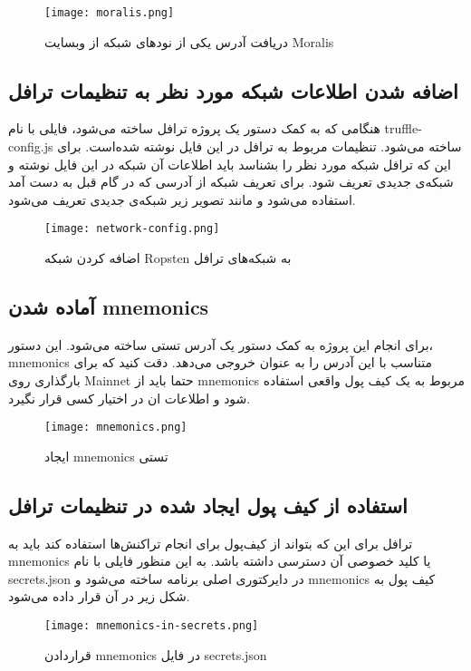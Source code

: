\begin{figure}[ht]
\centerline{\texttt{[image: moralis.png]}}
\caption{دریافت آدرس یکی از نود‌های شبکه از وبسایت Moralis}
\label{fig:moralis}
\end{figure}

\subsection{اضافه شدن اطلاعات شبکه مورد نظر به تنظیمات ترافل}
هنگامی که به کمک دستور
یک پروژه ترافل ساخته می‌شود، فایلی با نام truffle-config.js ساخته می‌شود. تنظیمات مربوط به ترافل در این فایل نوشته شده‌است. برای این که ترافل شبکه مورد نظر را بشناسد باید اطلاعات آن شبکه در این فایل نوشته و شبکه‌ی جدیدی تعریف شود. برای تعریف شبکه از آدرسی که در گام قبل به دست آمد استفاده می‌شود و مانند تصویر زیر شبکه‌ی جدیدی تعریف می‌شود.

\begin{figure}[ht]
\centerline{\texttt{[image: network-config.png]}}
\caption{اضافه کردن شبکه Ropsten به شبکه‌های ترافل}
\label{fig:network-config}
\end{figure}


\subsection{آماده شدن mnemonics}
برای انجام این پروژه به کمک دستور
یک آدرس تستی ساخته می‌شود. این دستور، mnemonics متناسب با این آدرس را به عنوان خروجی می‌دهد. دقت کنید که برای بارگذاری روی
\gls{Mainnet}
حتما باید از mnemonics مربوط به یک کیف پول واقعی استفاده شود و اطلاعات ان در اختیار کسی قرار نگیرد.

\begin{figure}[ht]
\centerline{\texttt{[image: mnemonics.png]}}
\caption{ایجاد mnemonics تستی}
\label{fig:mnemonics}
\end{figure}


\subsection{استفاده از کیف پول ایجاد شده در تنظیمات ترافل}
ترافل برای این که بتواند از کیف‌پول برای انجام تراکنش‌ها استفاده کند باید به mnemonics یا کلید خصوصی آن دسترسی داشته باشد. به این منظور فایلی با نام secrets.json در دایرکتوری اصلی برنامه ساخته می‌شود و mnemonics کیف پول به شکل زیر در آن قرار داده می‌شود.

\begin{figure}[ht]
\centerline{\texttt{[image: mnemonics-in-secrets.png]}}
\caption{قراردادن mnemonics در فایل secrets.json}
\label{fig:mnemonics-in-secrets}
\end{figure}


